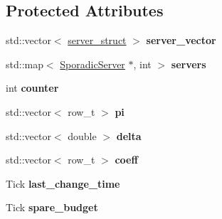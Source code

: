 \subsection*{Protected Attributes}
\begin{DoxyCompactItemize}
\item 
std\+::vector$<$ \hyperlink{structRTSim_1_1SparePot_1_1server__struct}{server\+\_\+struct} $>$ {\bfseries server\+\_\+vector}\hypertarget{classRTSim_1_1SparePot_a471b988e1a635abfa8c04fe91d3d5719}{}\label{classRTSim_1_1SparePot_a471b988e1a635abfa8c04fe91d3d5719}

\item 
std\+::map$<$ \hyperlink{classRTSim_1_1SporadicServer}{Sporadic\+Server} $\ast$, int $>$ {\bfseries servers}\hypertarget{classRTSim_1_1SparePot_aca67a5ad1c36bab41b80d9692864947e}{}\label{classRTSim_1_1SparePot_aca67a5ad1c36bab41b80d9692864947e}

\item 
int {\bfseries counter}\hypertarget{classRTSim_1_1SparePot_a5bd61c3f17f18e4c4dee0be3048b8b67}{}\label{classRTSim_1_1SparePot_a5bd61c3f17f18e4c4dee0be3048b8b67}

\item 
std\+::vector$<$ row\+\_\+t $>$ {\bfseries pi}\hypertarget{classRTSim_1_1SparePot_a059d657dadf69e7ebc3c294f4c0d1fda}{}\label{classRTSim_1_1SparePot_a059d657dadf69e7ebc3c294f4c0d1fda}

\item 
std\+::vector$<$ double $>$ {\bfseries delta}\hypertarget{classRTSim_1_1SparePot_abb0af09c6871b29918e2276c7240911e}{}\label{classRTSim_1_1SparePot_abb0af09c6871b29918e2276c7240911e}

\item 
std\+::vector$<$ row\+\_\+t $>$ {\bfseries coeff}\hypertarget{classRTSim_1_1SparePot_ac3e5df35ae6ced1e52fbd9f60712770e}{}\label{classRTSim_1_1SparePot_ac3e5df35ae6ced1e52fbd9f60712770e}

\item 
Tick {\bfseries last\+\_\+change\+\_\+time}\hypertarget{classRTSim_1_1SparePot_a8b7f8e3284d7bbe2ab24dc13a1e15f21}{}\label{classRTSim_1_1SparePot_a8b7f8e3284d7bbe2ab24dc13a1e15f21}

\item 
Tick {\bfseries spare\+\_\+budget}\hypertarget{classRTSim_1_1SparePot_aa2ed166e456c5a2839140d0dbcc3275d}{}\label{classRTSim_1_1SparePot_aa2ed166e456c5a2839140d0dbcc3275d}

\end{DoxyCompactItemize}
